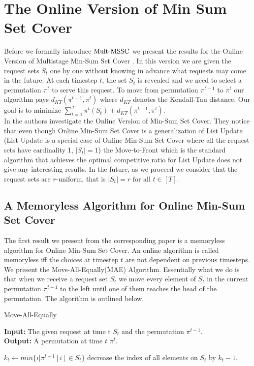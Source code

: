 \section{The Online Version of Min Sum Set Cover}

\noindent
Before we formally introduce $\mathrm{Mult}\text{-}\mathrm{MSSC}$ we present the results for the Online Version of Multistage Min-Sum Set Cover \cite{FKKSV20}. In this version we are given the request sets $S_t$ one by one without knowing in advance what requests may come in the future. At each timestep $t$, the set $S_t$ is revealed and we need to select a permutation $\pi^t$ to serve this request. To move from permutation $\pi^{t-1}$ to $\pi^t$ our algorithm pays $d_{KT} (\pi^{t-1}, \pi^t)$ where $d_{KT}$ denotes the Kendall-Tau distance. Our goal is to minimize $\sum_{t=1}^T \pi^t(S_t) + d_{KT} (\pi^{t-1}, \pi^t)$. \\

In \cite{FKKSV20} the authors investigate the Online Version of Min-Sum Set Cover. They notice that even though Online Min-Sum Set Cover is a generalization of List Update (List Update is a special case of Online Min-Sum Set Cover where all the request sets have cardinality 1, $|S_t| = 1$) the Move-to-Front which is the standard algorithm that achieves the optimal competitive ratio for List Update does not give any interesting results. In the future, as we proceed we consider that the request sets are $r$-uniform, that is $|S_t| = r \text{ for all } t \in [T]$.

\subsection{A Memoryless Algorithm for Online Min-Sum Set Cover}

The first result we present from the corresponding paper is a memoryless algorithm for Online Min-Sum Set Cover. An online algorithm is called memoryless iff the choices at timestep $t$ are not dependent on previous timesteps. We present the Move-All-Equally(MAE) Algorithm. Essentially what we do is that when we receive a request set $S_t$ we move every element of $S_t$ in the current permutation $\pi^{t-1}$ to the left until one of them reaches the head of the permutation. The algorithm is outlined below.

\begin{algorithm}[ht]
  \caption{Move-All-Equally}\label{alg:MAE}
  \textbf{Input:} The given request at time t $S_t$ and the permutation $\pi^{t-1}$.\\
  \textbf{Output:} A permutation at time $t$ $\pi^t$.

 \begin{algorithmic}[1]
    \STATE $k_t \leftarrow min\{ i | \pi^{t-1} [ i ] \in S_t \}$
    \STATE decrease the index of all elements on $S_t$ by $k_t - 1$.

  \end{algorithmic}
\end{algorithm}

